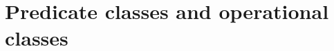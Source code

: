 \documentclass[a4paper,10pt,runningheads]{llncs}
\begin{document}
% 
% 
% 

\section{Predicate classes and operational classes}
\end{document}
